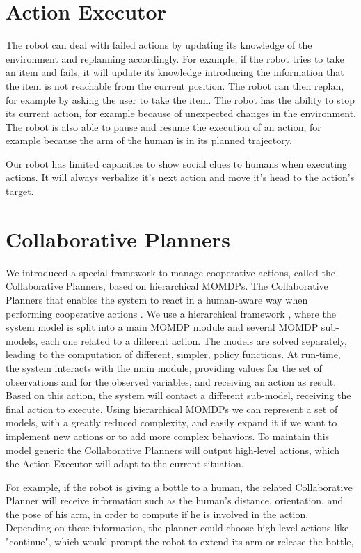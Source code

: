 \section{Action Executor}
The robot can deal with failed actions by updating its knowledge of the environment and replanning accordingly. For example, if the robot tries to take an item and fails, it will update its knowledge introducing the information that the item is not reachable  from the current position. The robot can then replan, for example by asking the user to take the item. The robot has the ability to stop its current action, for example because of unexpected changes in the environment. The robot is also able  to pause and resume the execution of an action, for example because the arm of the human  is in its planned trajectory.

Our robot has limited capacities to show social clues to humans when executing actions. It will always verbalize it's next action and move it's head to the action's target.


\section{Collaborative Planners} %
We introduced a special framework to manage cooperative actions, called the Collaborative Planners, based on hierarchical MOMDPs.  The Collaborative Planners that enables the system to react in a human-aware way when performing cooperative actions . We use a hierarchical framework \cite{pineau2001hierarchical}, where the system model is split into a main MOMDP module and several MOMDP sub-models, each one related to a different action. The models are solved separately, leading to the computation of different, simpler, policy functions. At run-time, the system interacts with the main module, providing values for the set of observations and for the observed variables, and receiving an action as result. Based on this action, the system will contact a different sub-model, receiving the final action to execute. Using hierarchical MOMDPs we can represent a set of models, with a greatly reduced complexity, and easily expand it if we want to implement new actions or to add more complex behaviors. To maintain this model generic the Collaborative Planners will output high-level actions, which the Action Executor will adapt to the current situation.

For example, if the robot is giving a bottle to a human, the related Collaborative Planner will receive information such as the human's distance, orientation, and the pose of his arm, in order to compute if he is involved in the action. Depending on these information, the planner could choose high-level actions like "continue", which would prompt the robot to extend its arm or release the bottle, 


